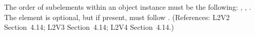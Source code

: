 The order of subelements within an \Event object instance must be
the following: , ,
.  The  element is
optional, but if present, must follow .
(References: L2V2 Section~4.14; L2V3 Section~4.14; L2V4 Section~4.14.)
